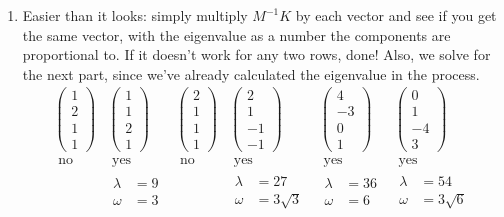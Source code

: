 \documentclass[twoside,10pt]{amsart}
\begin{document}
\begin{enumerate}
\item Easier than it looks: simply multiply $M^{-1}K$ by each vector and see if you get the same vector, with the eigenvalue as a number the components are proportional to.  If it doesn't work for any two rows, done!  Also, we solve for the next part, since we've already calculated the eigenvalue in the process.  
\[
\begin{aligned}
  \left( \begin{matrix} 1 \\ 2 \\ 1 \\ 1 \end{matrix} \right) & \left( \begin{matrix} 1 \\ 1 \\ 2 \\ 1 \end{matrix} \right) & \left( \begin{matrix} 2 \\ 1 \\ 1 \\ 1 \end{matrix} \right) & \left( \begin{matrix} 2 \\ 1 \\ -1 \\ -1 \end{matrix} \right) & \left( \begin{matrix} 4 \\ -3 \\ 0 \\ 1 \end{matrix} \right) & \left( \begin{matrix} 0 \\ 1 \\ -4 \\ 3 \end{matrix} \right) \\ \text{ no } & \text{ yes } & \text{ no } & \text{ yes } & \text{ yes } & \text{ yes } \\ & \begin{aligned} \lambda & = 9 \\ \omega & =3 \end{aligned} & & \begin{aligned} \lambda & = 27 \\ \omega & = 3 \sqrt{3} \end{aligned} & \begin{aligned} \lambda & =36 \\ \omega & = 6 \end{aligned} & \begin{aligned} \lambda & = 54 \\ \omega & = 3\sqrt{6} \end{aligned} 

\end{aligned}\]
\end{enumerate}
\end{document}

